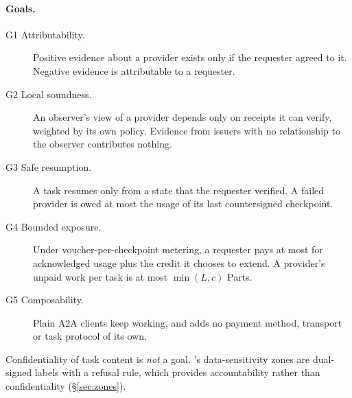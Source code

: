 \paragraph{Goals.}
\begin{description}
\item[G1 Attributability.] Positive evidence about a provider exists only
  if the requester agreed to it. Negative evidence is attributable to a
  requester.
\item[G2 Local soundness.] An observer's view of a provider depends only on
  receipts it can verify, weighted by its own policy. Evidence from
  issuers with no relationship to the observer contributes nothing.
\item[G3 Safe resumption.] A task resumes only from a state that the
  requester verified. A failed provider is owed at most the usage of its
  last countersigned checkpoint.
\item[G4 Bounded exposure.] Under voucher-per-checkpoint metering, a
  requester pays at most for acknowledged usage plus the credit it chooses
  to extend. A provider's unpaid work per task is at most
  $\min(L, c)$ Parts.
\item[G5 Composability.] Plain A2A clients keep working, and \sys{} adds
  no payment method, transport or task protocol of its own.
\end{description}
Confidentiality of task content is \emph{not} a goal. \sys{}'s
data-sensitivity zones are dual-signed labels with a refusal rule, which
provides accountability rather than confidentiality (\S\ref{sec:zones}).
